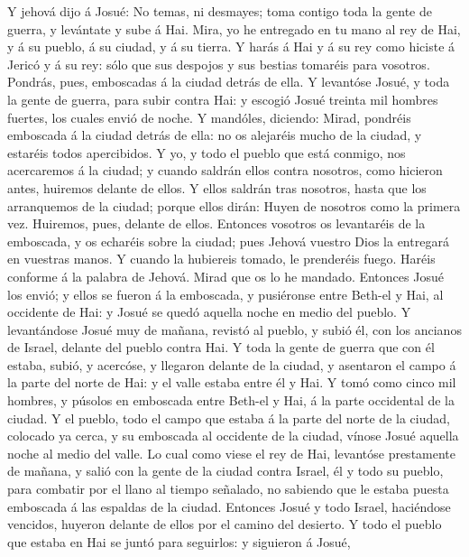  Y jehová dijo á Josué: No temas, ni desmayes; toma contigo
toda la gente de guerra, y levántate y sube á Hai. Mira, yo he entregado
en tu mano al rey de Hai, y á su pueblo, á su ciudad, y á su tierra.
 Y harás á Hai y á su rey como hiciste á Jericó y á su rey:
sólo que sus despojos y sus bestias tomaréis para vosotros. Pondrás,
pues, emboscadas á la ciudad detrás de ella.  Y levantóse
Josué, y toda la gente de guerra, para subir contra Hai: y escogió Josué
treinta mil hombres fuertes, los cuales envió de noche.  Y
mandóles, diciendo: Mirad, pondréis emboscada á la ciudad detrás de
ella: no os alejaréis mucho de la ciudad, y estaréis todos apercibidos.
 Y yo, y todo el pueblo que está conmigo, nos acercaremos á
la ciudad; y cuando saldrán ellos contra nosotros, como hicieron antes,
huiremos delante de ellos.  Y ellos saldrán tras nosotros,
hasta que los arranquemos de la ciudad; porque ellos dirán: Huyen de
nosotros como la primera vez. Huiremos, pues, delante de ellos.
 Entonces vosotros os levantaréis de la emboscada, y os
echaréis sobre la ciudad; pues Jehová vuestro Dios la entregará en
vuestras manos.  Y cuando la hubiereis tomado, le prenderéis
fuego. Haréis conforme á la palabra de Jehová. Mirad que os lo he
mandado.  Entonces Josué los envió; y ellos se fueron á la
emboscada, y pusiéronse entre Beth-el y Hai, al occidente de Hai: y
Josué se quedó aquella noche en medio del pueblo.  Y
levantándose Josué muy de mañana, revistó al pueblo, y subió él, con los
ancianos de Israel, delante del pueblo contra Hai.  Y toda
la gente de guerra que con él estaba, subió, y acercóse, y llegaron
delante de la ciudad, y asentaron el campo á la parte del norte de Hai:
y el valle estaba entre él y Hai.  Y tomó como cinco mil
hombres, y púsolos en emboscada entre Beth-el y Hai, á la parte
occidental de la ciudad.  Y el pueblo, todo el campo que
estaba á la parte del norte de la ciudad, colocado ya cerca, y su
emboscada al occidente de la ciudad, vínose Josué aquella noche al medio
del valle.  Lo cual como viese el rey de Hai, levantóse
prestamente de mañana, y salió con la gente de la ciudad contra Israel,
él y todo su pueblo, para combatir por el llano al tiempo señalado, no
sabiendo que le estaba puesta emboscada á las espaldas de la ciudad.
 Entonces Josué y todo Israel, haciéndose vencidos, huyeron
delante de ellos por el camino del desierto.  Y todo el
pueblo que estaba en Hai se juntó para seguirlos: y siguieron á Josué,
